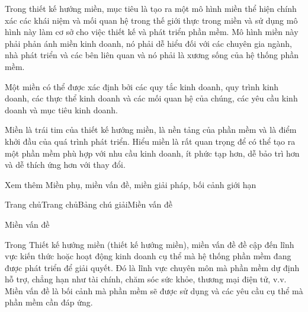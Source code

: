 Trong thiết kế hướng miền, mục tiêu là tạo ra một mô hình miền thể hiện chính xác các khái niệm và mối quan hệ trong thế giới thực trong miền và sử dụng mô hình này làm cơ sở cho việc thiết kế và phát triển phần mềm. Mô hình miền này phải phản ánh miền kinh doanh, nó phải dễ hiểu đối với các chuyên gia ngành, nhà phát triển và các bên liên quan và nó phải là xương sống của hệ thống phần mềm.

Một miền có thể được xác định bởi các quy tắc kinh doanh, quy trình kinh doanh, các thực thể kinh doanh và các mối quan hệ của chúng, các yêu cầu kinh doanh và mục tiêu kinh doanh.

Miền là trái tim của thiết kế hướng miền, là nền tảng của phần mềm và là điểm khởi đầu của quá trình phát triển. Hiểu miền là rất quan trọng để có thể tạo ra một phần mềm phù hợp với nhu cầu kinh doanh, ít phức tạp hơn, dễ bảo trì hơn và dễ thích ứng hơn với thay đổi.

Xem thêm	 Miền phụ, miền vấn đề, miền giải pháp, bối cảnh giới hạn









Trang chủTrang chủBảng chú giảiMiền vấn đề

Miền vấn đề

Trong Thiết kế hướng miền (thiết kế hướng miền), miền vấn đề đề cập đến lĩnh vực kiến thức hoặc hoạt động kinh doanh cụ thể mà hệ thống phần mềm đang được phát triển để giải quyết. Đó là lĩnh vực chuyên môn mà phần mềm dự định hỗ trợ, chẳng hạn như tài chính, chăm sóc sức khỏe, thương mại điện tử, v.v. Miền vấn đề là bối cảnh mà phần mềm sẽ được sử dụng và các yêu cầu cụ thể mà phần mềm cần đáp ứng.

